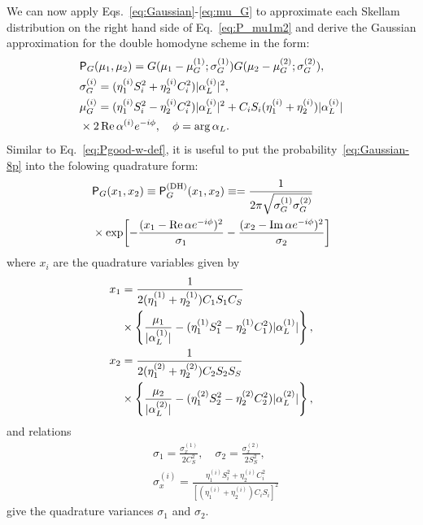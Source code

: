 \documentclass[%
reprint,
superscriptaddress,
 amsmath,amssymb,amsfonts,
 aps,
 pra,
 longbibliography
]{revtex4-2}
\renewcommand{\Re}{\mathop{\rm Re}\nolimits}
\renewcommand{\Im}{\mathop{\rm Im}\nolimits}
\newcommand{\ind}[1]{\mathrm{#1}}
\newcommand{\prob}{\mathsf{P}}
\begin{document}
We can now apply Eqs.~\eqref{eq:Gaussian}-\eqref{eq:mu_G}
to approximate each Skellam distribution on
the right hand side of Eq.~\eqref{eq:P_mu1m2}
and derive the Gaussian approximation
for the double homodyne scheme in the form:
\begin{align}
  &
  \label{eq:Gaussian-8p}
    \prob_G(\mu_1,\mu_2)=G(\mu_1-\mu_G^{(1)};\sigma_G^{(1)})G(\mu_2-\mu_G^{(2)};\sigma_G^{(2)}),
    \\
  &
    \label{eq:sigma_G-i}
    \sigma_G^{(i)}=
    (\eta_1^{(i)}S_i^2+\eta_2^{(i)}C_i^2) |\alpha_L^{(i)}|^2,
  \\
  &
    \label{eq:mu_G-i}
    \mu_G^{(i)}=
    (\eta_1^{(i)}S_i^2-\eta_2^{(i)}C_i^2) |\alpha_L^{(i)}|^2
    +C_iS_i (\eta_1^{(i)}+\eta_2^{(i)})|\alpha_L^{(i)}| 
    \notag
  \\
  &
    \times
    2\Re\alpha^{(i)} e^{-i\phi},\quad \phi=\arg\alpha_L.
\end{align}
Similar to Eq.~\eqref{eq:Pgood-w-def},
it is useful to put
the probability~\eqref{eq:Gaussian-8p}
into the folowing quadrature form:
\begin{align}
  \label{eq:P_G-x1x2}
  &
    \prob_G(x_1,x_2)\equiv \prob_G^{(\ind{DH})}(x_1,x_2)\equiv 
    =\frac{1}{2\pi\sqrt{\sigma_G^{(1)}\sigma_G^{(2)}}}
  \notag
  \\
  &
                      \times \exp\biggl[
    -\frac{(x_1-\Re\alpha e^{-i\phi})^2}{\sigma_1}
    -\frac{(x_2-\Im\alpha e^{-i\phi})^2}{\sigma_2}
    \biggr]
\end{align}
where $x_i$ are the quadrature variables given by
\begin{align}
  \label{eq:x-1}
  x_1&=
  \frac{1}{2(\eta_1^{(1)}+\eta_2^{(1)})C_1S_1C_S}
  \notag
  \\
  &
    \times
  \left\{
  \frac{\mu_1}{|\alpha_L^{(1)}|}-(\eta_1^{(1)}S_1^2-\eta_2^{(1)}C_1^2) |\alpha_L^{(1)}|
    \right\},
  \\
  \label{eq:x-2}
  x_2&=
  \frac{1}{2(\eta_1^{(2)}+\eta_2^{(2)})C_2S_2S_S}
  \notag
  \\
  &
    \times
  \left\{
  \frac{\mu_2}{|\alpha_L^{(2)}|}-(\eta_1^{(2)}S_2^2-\eta_2^{(2)}C_2^2) |\alpha_L^{(2)}|
    \right\},
\end{align}
and relations
\begin{align}
  &
  \label{eq:sigm-i}
    \sigma_1=\frac{\sigma_x^{(1)}}{ 2 C_S^2},
    \quad
    \sigma_2=\frac{\sigma_x^{(2)}}{ 2 S_S^2},
  \\
  &
    \label{eq:sigm-x-i}
    \sigma_x^{(i)}=\frac{\eta_1^{(i)}S_i^2+\eta_2^{(i)}C_i^2}{
    \left[(\eta_1^{(i)}+\eta_2^{(i)})C_iS_i\right]^2
    }
\end{align}
give the quadrature variances $\sigma_1$ and $\sigma_2$.
\end{document}
